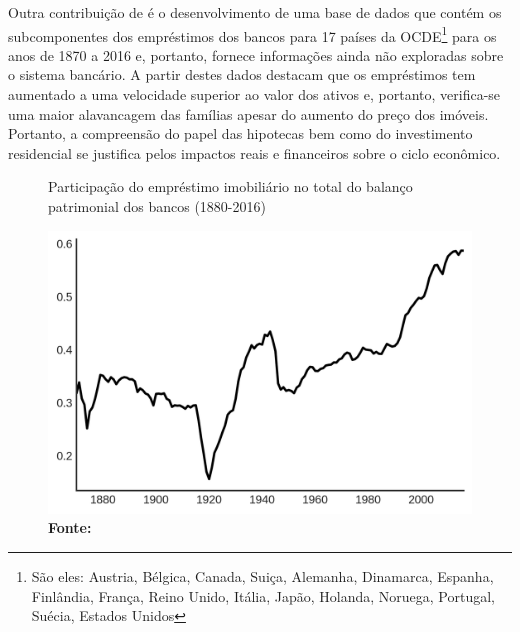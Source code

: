 Outra contribuição de \citeauthor*{jorda_great_2014} é o desenvolvimento de uma base de dados que contém os subcomponentes dos empréstimos dos bancos para 17 países da OCDE\footnote{São eles: Austria, Bélgica, Canada, Suiça, Alemanha, Dinamarca, Espanha, Finlândia, França, Reino Unido, Itália, Japão, Holanda, Noruega, Portugal, Suécia, Estados Unidos} para os anos de 1870 a 2016 e, portanto, fornece informações ainda não exploradas sobre o sistema bancário. A partir destes dados destacam que os empréstimos tem aumentado a uma velocidade superior ao valor dos ativos e, portanto, verifica-se uma maior alavancagem das famílias apesar do aumento do preço dos imóveis. Portanto, a compreensão do papel das hipotecas bem como do investimento residencial se justifica pelos impactos reais e financeiros sobre o ciclo econômico.



\begin{figure}
	\centering
	\caption{Participação do empréstimo imobiliário no total do balanço patrimonial dos bancos (1880-2016)}
	\label{GraficoJorda}
	\includegraphics{Jorda_Mean.png}
	\caption*{\textbf{Fonte:} \textcite[p.~10]{jorda_great_2014}}
\end{figure}

